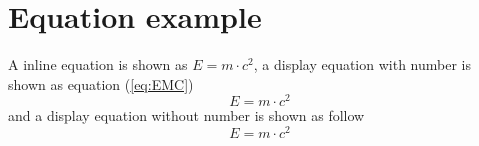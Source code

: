 \section{Equation example} \label{sec: equation}

A inline equation is shown as $E = m\cdot c^{2}$, a display equation with number is shown as equation (\ref{eq:EMC})
\begin{equation}\label{eq:EMC}
E = m \cdot c^{2}
\end{equation}
and a display equation without number is shown as follow
\[
E=m\cdot c^{2}
\]
